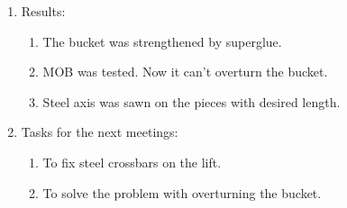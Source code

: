\begin{enumerate}
\begin{enumerate}
    \end{enumerate}
    
	\item Results:
	\begin{enumerate}
	  \item The bucket was strengthened by superglue.
	  
	  \item MOB was tested. Now it can't overturn the bucket.
	  
	  \item Steel axis was sawn on the pieces with desired length.
	  
    \end{enumerate}
    
	\item Tasks for the next meetings:
	\begin{enumerate}
	  \item To fix steel crossbars on the lift.
	  
	  \item To solve the problem with overturning the bucket.
	  
    \end{enumerate}     
\end{enumerate}
\fillpage
